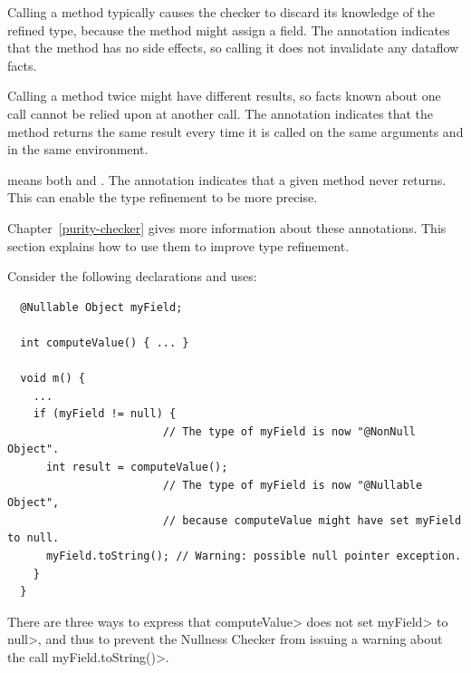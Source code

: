 Calling a method typically causes the checker to discard its knowledge of
the refined type, because the method might assign a field.
The  annotation indicates that
the method has no side effects, so calling it does not invalidate any
dataflow facts.

Calling a method twice might have different results, so facts known about
one call cannot be relied upon at another call.
The  annotation indicates that
the method returns the same result every time it is called on the same
arguments and in the same environment.

 means both
 and
.
The  annotation
indicates that a given method never returns.  This can enable the
type refinement to be more precise.

Chapter~\ref{purity-checker} gives more information about these annotations.
This section explains how to use them to improve type refinement.



Consider the following declarations and uses:

\begin{Verbatim}
  @Nullable Object myField;

  int computeValue() { ... }

  void m() {
    ...
    if (myField != null) {
                        // The type of myField is now "@NonNull Object".
      int result = computeValue();
                        // The type of myField is now "@Nullable Object",
                        // because computeValue might have set myField to null.
      myField.toString(); // Warning: possible null pointer exception.
    }
  }
\end{Verbatim}

There are three ways to express that \<computeValue> does not set
\<myField> to \<null>, and thus to prevent the Nullness Checker from
issuing a warning about the call \<myField.toString()>.

